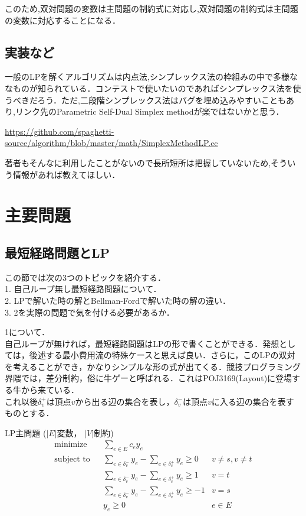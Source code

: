 \documentclass[13pt]{jarticle}
\theoremstyle{nonitalic} %
\begin{document}
このため,双対問題の変数は主問題の制約式に対応し,双対問題の制約式は主問題の変数に対応することになる．

\subsection{実装など}
一般のLPを解くアルゴリズムは内点法,シンプレックス法の枠組みの中で多様ななものが知られている．コンテストで使いたいのであればシンプレックス法を使うべきだろう．ただ,二段階シンプレックス法はバグを埋め込みやすいこともあり,リンク先のParametric Self-Dual Simplex methodが楽ではないかと思う．

\url{https://github.com/spaghetti-source/algorithm/blob/master/math/SimplexMethodLP.cc}

著者もそんなに利用したことがないので長所短所は把握していないため,そういう情報があれば教えてほしい．

\section{主要問題}

\subsection{最短経路問題とLP}
\label{sec:shortpath}
この節では次の3つのトピックを紹介する． \\
1. 自己ループ無し最短経路問題について． \\
2. LPで解いた時の解とBellman-Fordで解いた時の解の違い．\\
3. 2を実際の問題で気を付ける必要があるか．


1について．\\
自己ループが無ければ，最短経路問題はLPの形で書くことができる．発想としては，後述する最小費用流の特殊ケースと思えば良い．さらに，このLPの双対を考えることができ，かなりシンプルな形の式が出てくる．競技プログラミング界隈では，差分制約，俗に牛ゲーと呼ばれる．これはPOJ3169(Layout)に登場する牛から来ている． \\

これ以後$\delta_{v}^+$は頂点$v$から出る辺の集合を表し，$\delta_{v}^-$は頂点$v$に入る辺の集合を表すものとする．

LP主問題
($|E|$変数， $|V|$制約)
\begin{align}
 &&&&&\textrm{minimize}   && \sum_{e  \in E} c_e y_e \\
 &&&&&\textrm{subject to} && \sum_{e \in \delta_v^- } y_e - \sum_{e \in \delta_v^+} y_e \geq 0 & v\neq s, v\neq t  &&&&&\\
 &&&&&                    && \sum_{e \in \delta_v^- } y_e - \sum_{e \in \delta_v^+} y_e \geq 1 & v = t  &&&&&\\
 &&&&&                    && \sum_{e \in \delta_v^- } y_e - \sum_{e \in \delta_v^+} y_e \geq -1 & v = s  &&&&&\\
 &&&&&                    &&  y_e \geq 0 & e \in E&&&&&
\end{align}
\end{document}
